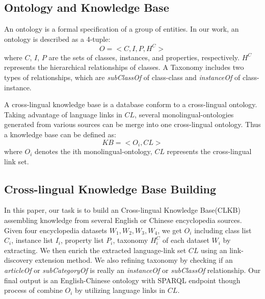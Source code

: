 \documentclass[runningheads,a4paper]{llncs}
\begin{document}
\subsection{Ontology and Knowledge Base}

An ontology is a formal specification of a group of entities. In our work, an ontology is described as a 4-tuple:
\begin{equation}
    O = <C,I,P,H^C>
\end{equation}
where $C$, $I$, $P$ are the sets of classes, instances, and properties, respectively. $H^C$ represents the hierarchical relationships of classes. A Taxonomy includes two types of relationships, which are \textit{subClassOf} of class-class and \textit{instanceOf} of class-instance.

A cross-lingual knowledge base is a database conform to a cross-lingual ontology. Taking advantage of language links in $CL$, several monolingual-ontologies generated from various sources can be merge into one cross-lingual ontology.  Thus a knowledge base can be defined as:
\begin{equation}
    KB = <O_{i}, CL>
\end{equation}
where $O_{i}$ denotes the ith monolingual-ontology, $CL$ represents the cross-lingual link set.

\subsection{Cross-lingual Knowledge Base Building}
In this paper, our task is to build an Cross-lingual Knowledge Base(CLKB) assembling knowledge from several English or Chinese encyclopedia sources. Given four encyclopedia datasets $W_{1},W_{2},W_{3},W_{4}$, we get $O_{i}$ including class list $C_{i}$, instance list $I_{i}$, property list $P_{i}$, taxonomy $H^C_{i}$ of each dataset $W_{i}$ by extracting. We then enrich the extracted language-link set $CL$ using an link-discovery extension method. We also refining taxonomy by checking if an \textit{articleOf} or \textit{subCategoryOf} is really an \textit{instanceOf} or \textit{subClassOf} relationship. Our final output is an English-Chinese ontology  with SPARQL endpoint though process of combine $O_{i}$ by utilizing language links in $CL$. 
\end{document}
